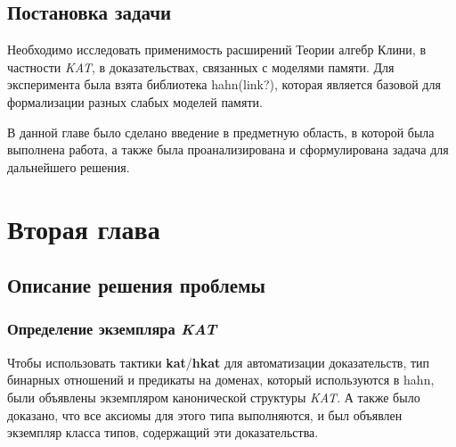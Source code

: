 \documentclass[times
              ]{itmo-student-thesis}
\begin{document}
  \section{Постановка задачи}
    Необходимо исследовать применимость расширений Теории алгебр Клини, в частности \textit{KAT}, в доказательствах, связанных с моделями памяти.
    Для эксперимента была взята библиотека hahn(link?), которая является базовой для формализации разных слабых моделей памяти.


  \chapterconclusion %
    В данной главе было сделано введение в предметную область, в которой была выполнена работа,
    а также была проанализирована и сформулирована задача для дальнейшего решения.
\chapter{Вторая глава}

  \section{Описание решения проблемы}

    \subsection{Определение экземпляра \textit{KAT}}
    Чтобы использовать тактики \textbf{kat}/\textbf{hkat} для автоматизации доказательств,
    тип бинарных отношений и предикаты на доменах, который используются в hahn, были объявлены экземпляром канонической структуры \textit{KAT}.
    А также было доказано, что все аксиомы для этого типа выполняются, и был объявлен экземпляр класса типов, содержащий эти доказательства.

\end{document}
